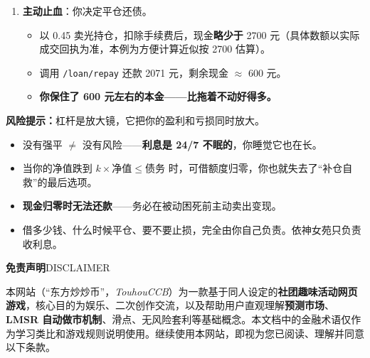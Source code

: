 \documentclass[11pt,a4paper,twoside]{article}
\begin{document}
\begin{exbox}
\begin{enumerate}
  \item \textbf{主动止血}：你决定平仓还债。
  \begin{itemize}
    \item 以 0.45 卖光持仓，扣除手续费后，现金\textbf{略少于} 2700 元（具体数额以实际成交回执为准，本例为方便计算近似按 2700 估算）。
    \item 调用 \texttt{/loan/repay} 还款 2071 元，剩余现金 $\approx$ 600 元。
    \item \textbf{你保住了 600 元左右的本金——比拖着不动好得多。}
  \end{itemize}
\end{enumerate}
\end{exbox}

\begin{warnbox}
\textbf{风险提示：}\;杠杆是放大镜，它把你的盈利和亏损同时放大。

\begin{itemize}
  \item 没有强平 $\neq$ 没有风险——\textbf{利息是 24/7 不眠的}，你睡觉它也在长。
  \item 当你的净值跌到 $k \times \text{净值} \leq \text{债务}$ 时，可借额度归零，你也就失去了“补仓自救”的最后选项。
  \item \textbf{现金归零时无法还款}——务必在被动困死前主动卖出变现。
  \item 借多少钱、什么时候平仓、要不要止损，完全由你自己负责。依神女苑只负责收利息。
\end{itemize}
\end{warnbox}

\clearpage
\thispagestyle{empty}
\vspace*{1.2cm}

{\sffamily\bfseries\Large 免责声明}\hfill{\sffamily\small\color{soft}DISCLAIMER}\par
\vspace{0.3em}
\noindent\makebox[\linewidth][c]{\textcolor{rule}{\rule{0.88\linewidth}{1pt}}}
\vspace{1em}

\small
\setlength{\parskip}{0.6em}

本网站（“东方炒炒币”，\textit{TouhouCCB}）为一款基于同人设定的\textbf{社团趣味活动网页游戏}，核心目的为娱乐、二次创作交流，以及帮助用户直观理解\textbf{预测市场}、\textbf{LMSR 自动做市机制}、滑点、无风险套利等基础概念。本文档中的金融术语仅作为学习类比和游戏规则说明使用。继续使用本网站，即视为您已阅读、理解并同意以下条款。
\end{document}
